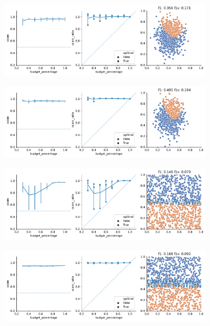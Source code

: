 \begin{figure}
    \begin{subfigure}{.5\textwidth}
        \centering
        \includegraphics[width=\textwidth]{img/2d/3.pdf}
    \end{subfigure}%
    \begin{subfigure}{.5\textwidth}
        \centering
        \includegraphics[width=\textwidth]{img/2d/4.pdf}
    \end{subfigure}%
    \hfill
    \begin{subfigure}{.5\textwidth}
        \centering
        \includegraphics[width=\textwidth]{img/2d/8.pdf}
    \end{subfigure}%
    \begin{subfigure}{.5\textwidth}
        \centering
        \includegraphics[width=\textwidth]{img/2d/9.pdf}

\end{subfigure}
\end{figure}
